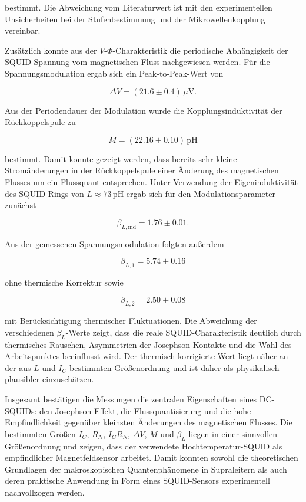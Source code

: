 \documentclass{article}
\begin{document}
bestimmt. Die Abweichung vom Literaturwert ist mit den experimentellen Unsicherheiten bei der Stufenbestimmung und der Mikrowellenkopplung vereinbar.

Zusätzlich konnte aus der $V$-$\Phi$-Charakteristik die periodische Abhängigkeit der SQUID-Spannung vom magnetischen Fluss nachgewiesen werden. Für die Spannungsmodulation ergab sich ein Peak-to-Peak-Wert von

\begin{equation}
    \Delta V = (21.6 \pm 0.4)\,\mu\mathrm{V}.
\end{equation}

Aus der Periodendauer der Modulation wurde die Kopplungsinduktivität der Rückkoppelspule zu

\begin{equation}
    M = (22.16 \pm 0.10)\,\mathrm{pH}
\end{equation}

bestimmt. Damit konnte gezeigt werden, dass bereits sehr kleine Stromänderungen in der Rückkoppelspule einer Änderung des magnetischen Flusses um ein Flussquant entsprechen. Unter Verwendung der Eigeninduktivität des SQUID-Rings von $L\approx 73\,\mathrm{pH}$ ergab sich für den Modulationsparameter zunächst

\begin{equation}
    \beta_{L,\mathrm{ind}} = 1.76 \pm 0.01.
\end{equation}

Aus der gemessenen Spannungsmodulation folgten außerdem

\begin{equation}
    \beta_{L,1}=5.74\pm0.16
\end{equation}

ohne thermische Korrektur sowie

\begin{equation}
    \beta_{L,2}=2.50\pm0.08
\end{equation}

mit Berücksichtigung thermischer Fluktuationen. Die Abweichung der verschiedenen $\beta_L$-Werte zeigt, dass die reale SQUID-Charakteristik deutlich durch thermisches Rauschen, Asymmetrien der Josephson-Kontakte und die Wahl des Arbeitspunktes beeinflusst wird. Der thermisch korrigierte Wert liegt näher an der aus $L$ und $I_C$ bestimmten Größenordnung und ist daher als physikalisch plausibler einzuschätzen.

Insgesamt bestätigen die Messungen die zentralen Eigenschaften eines DC-SQUIDs: den Josephson-Effekt, die Flussquantisierung und die hohe Empfindlichkeit gegenüber kleinsten Änderungen des magnetischen Flusses. Die bestimmten Größen $I_C$, $R_N$, $I_CR_N$, $\Delta V$, $M$ und $\beta_L$ liegen in einer sinnvollen Größenordnung und zeigen, dass der verwendete Hochtemperatur-SQUID als empfindlicher Magnetfeldsensor arbeitet. Damit konnten sowohl die theoretischen Grundlagen der makroskopischen Quantenphänomene in Supraleitern als auch deren praktische Anwendung in Form eines SQUID-Sensors experimentell nachvollzogen werden.
\end{document}
